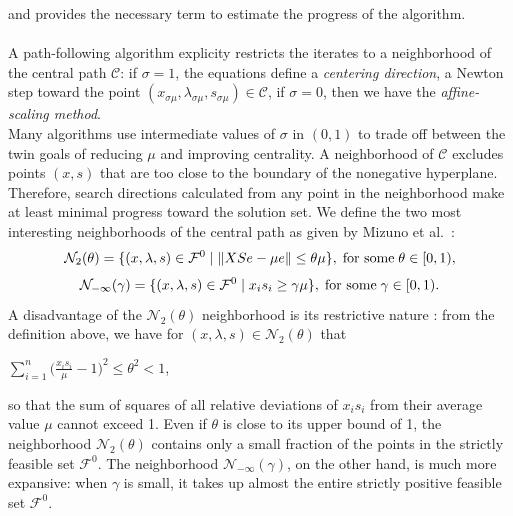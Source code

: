 \documentclass[a4paper,10 pt,titlepage,twoside]{book}
\theoremstyle{plain}
\theoremstyle{definition}
\theoremstyle{remark}
\begin{document}
 and provides the necessary term to estimate the progress of the
 algorithm.\\  
 \\
 A path-following algorithm explicity restricts the iterates to a neighborhood of the central path $\mathcal{C}$: if $\sigma = 1$, the equations define a \textit{centering direction}, a Newton step toward the point $(x_{\sigma\mu},\lambda_{\sigma\mu}, s_{\sigma\mu})\in\mathcal{C}$, if $\sigma = 0$, then we have the \textit{affine-scaling method}.\\  
 Many algorithms use intermediate values of $\sigma$ in $(0,1)$ to trade off between the twin goals of reducing $\mu$ and improving centrality. A neighborhood of $\mathcal{C}$ excludes points $(x, s) $ that are too close to the boundary of the nonegative hyperplane. Therefore, search directions calculated from any point in the neighborhood make at least minimal progress toward the solution set.
 We define the two most interesting neighborhoods of the central path as given
by Mizuno et al.~\cite{5}:\\
\begin{equation*}
\mathcal{N}_{2}(\theta) =\{(x, \lambda,s)\in\mathcal{F}^{0} \;|\;\lVert XSe - \mu e \rVert \leq \theta \mu \}, \text{\;for some\;} \theta \in [0,1),
\end{equation*} 
\begin{equation*}
\mathcal{N}_{-\infty}(\gamma) =\{ (x, \lambda,s)\in\mathcal{F}^{0} \;|\; x_{i}s_{i} \geq \gamma \mu \}, \text{\;for some\;} \gamma \in [0,1).
\end{equation*} 
A disadvantage of the $\mathcal{N}_{2}(\theta)$ neighborhood is its restrictive nature \cite{W}: from the definition above, we have for $(x, \lambda,s)\in\mathcal{N}_{2}(\theta)$ that
\begin{center}
	$\sum\limits_{i=1}^{n}\big(\frac{x_{i}s_{i}}{\mu}-1\big)^{2}\leq \theta^{2}<1$,
\end{center} 
so that the sum of squares of all relative deviations of $x_{i}s_{i}$ from their average value $\mu$ cannot exceed 1. Even if $\theta$ is close to its upper bound of 1, the neighborhood $\mathcal{N}_{2}(\theta)$ contains only a small fraction of the points in the strictly feasible set $\mathcal{F}^{0}$. The neighborhood $\mathcal{N}_{-\infty}(\gamma)$, on the other hand, is much more expansive: when $\gamma$ is small, it takes up almost the entire strictly positive feasible set $\mathcal{F}^{0}$. 
\end{document}
